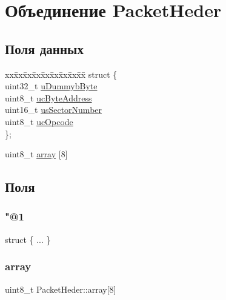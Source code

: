 \hypertarget{union_packet_heder}{}\section{Объединение Packet\+Heder}
\label{union_packet_heder}
\subsection*{Поля данных}
\begin{DoxyCompactItemize}
\item 
\begin{tabbing}
xx\=xx\=xx\=xx\=xx\=xx\=xx\=xx\=xx\=\kill
struct \{\\
\>uint32\_t \mbox{\hyperlink{union_packet_heder_af2a089bca824f60fd345fd04211c86e1}{uDummybByte}}\\
\>uint8\_t \mbox{\hyperlink{union_packet_heder_a9781e2eccbb56b6c5bea50fde2a4fa44}{ucByteAddress}}\\
\>uint16\_t \mbox{\hyperlink{union_packet_heder_a7ca58f1b0a4a6375a76549e30fa5233c}{usSectorNumber}}\\
\>uint8\_t \mbox{\hyperlink{union_packet_heder_a582ba4ef79c944f54d36e2e2104abb82}{ucOpcode}}\\
\}; \\

\end{tabbing}\item 
uint8\+\_\+t \mbox{\hyperlink{union_packet_heder_a3810a015f463623f0cd9efdbe1ffee55}{array}} \mbox{[}8\mbox{]}
\end{DoxyCompactItemize}


\subsection{Поля}
\mbox{\label{union_packet_heder_af44b56a7d536dc198049d7315c75ccc3}} 
\subsubsection{\texorpdfstring{"@1}{@1}}
{\footnotesize\ttfamily struct \{ ... \} }

\mbox{\label{union_packet_heder_a3810a015f463623f0cd9efdbe1ffee55}} 
\subsubsection{\texorpdfstring{array}{array}}
{\footnotesize\ttfamily uint8\+\_\+t Packet\+Heder\+::array\mbox{[}8\mbox{]}}

